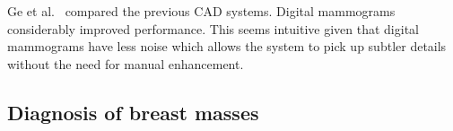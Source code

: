 Ge et al.~\cite{Ge2007} compared the previous CAD systems. Digital mammograms considerably improved performance. This seems intuitive given that digital mammograms have less noise which allows the system to pick up subtler details without the need for manual enhancement.


\subsection{Diagnosis of breast masses}
\begin{comment}
- Unsupervised convolutional networks, trained as autoencoders with some slight variations. Uses SVM for classification.
- Not really a convnet
\end{comment}

\begin{comment}
- not published report
- DDSM database (8752 mammograms)
- only lesion treatment
- they do ~detection (masses vs calcifications) and diagnosis (benign vs malignant).
- two convnest fpr eachtask
- lesions were segmented from the images using the truth labels. 
- Each image is selected so that the shorter dimension is 64 (the other dimension will normally be larger), then 2 to 3 patches are sampled at random positions and each one is rotated 8 times.
- resulted in 50K lesion images
- negative and benign = benign, everything else= malignant
- tried different network sizes.
- accuracy 87%
\end{comment}
\begin{comment}
A recent unpublished report~\cite{Agarwal2015} uses a big convolutional network (8 layers, $\sim$3.6M parameters) with recent features to diagnose lesions as benign or malignant. Clustered microcalcifications and masses are segmented from 8752 mammograms obtained from a public database (DDSM). Two to three square images ($64 \times 64$) are randomly sampled from each lesion and each of these is rotated 8 times (at 45° steps) producing 50K image lesions in total. No further preprocessing is performed. The convolutional network obtains 69.8\% accuracy on the task. Other performance metrics are not provided. This is a project report for a course in Convolutional Networks~\cite{Karpathy2015} and may be incomplete or incorrect. We acknowledge it here for completeness.
\end{comment}

